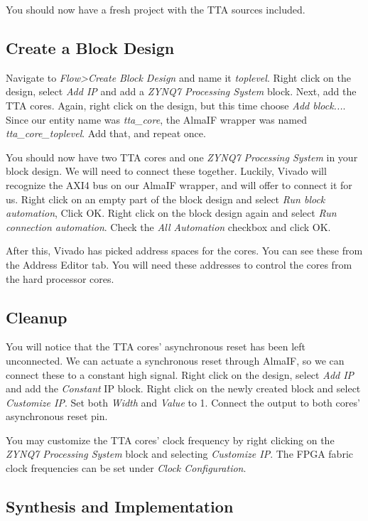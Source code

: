 \documentclass[twoside]{tceusermanual}
\begin{document}
You should now have a fresh project with the TTA sources included.

\subsection{Create a Block Design}

Navigate to \textit{Flow>Create Block Design} and name it \textit{toplevel}.
Right click on the design, select \textit{Add IP} and add a \textit{ZYNQ7
Processing System} block. Next, add the TTA cores. Again, right click on the
design, but this time choose \textit{Add block...}. Since our entity name
was \textit{tta\_core}, the AlmaIF wrapper was named
\textit{tta\_core\_toplevel}. Add that, and repeat once.

You should now have two TTA cores and one \textit{ZYNQ7 Processing System} in
your block design. We will need to connect these together. Luckily, Vivado
will recognize the AXI4 bus on our AlmaIF wrapper, and will offer to connect
it for us. Right click on an empty part of the block design and select
\textit{Run block automation}, Click OK. Right click on the block design again
and select \textit{Run connection automation}. Check  the
\textit{All Automation} checkbox and click OK.

After this, Vivado has picked address spaces for the cores. You can see these
from the Address Editor tab. You will need these addresses to control the cores
from the hard processor cores.

\subsection{Cleanup}

You will notice that the TTA cores' asynchronous reset has been left
unconnected. We can actuate a synchronous reset through AlmaIF, so we can
connect these to a constant high signal. Right click on the design, select
\textit{Add IP} and add the \textit{Constant} IP block. Right click on the
newly created block and select \textit{Customize IP}. Set both \textit{Width}
and \textit{Value} to 1. Connect the output to both cores' asynchronous reset
pin.

You may customize the TTA cores' clock frequency by right clicking on the
\textit{ZYNQ7 Processing System} block and selecting \textit{Customize IP}.
The FPGA fabric clock frequencies can be set under \textit{Clock Configuration}.

\subsection{Synthesis and Implementation}
\end{document}

